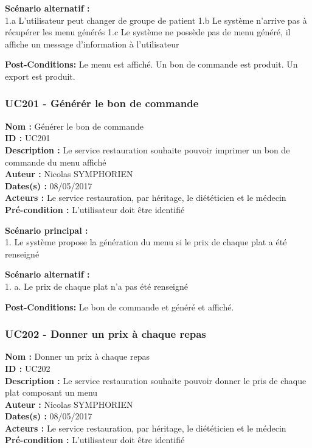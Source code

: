\textbf{Scénario alternatif :}\\
1.a L'utilisateur peut changer de groupe de patient 1.b Le système
n'arrive pas à récupérer les menu générés 1.c Le système ne possède pas
de menu généré, il affiche un message d'information à l'utilisateur

\textbf{Post-Conditions:} Le menu est affiché. Un bon de commande est
produit. Un export est produit.

\subsubsection{UC201 - Générér le bon de
commande}\label{uc201---guxe9nuxe9ruxe9r-le-bon-de-commande}

\noindent\textbf{Nom :} Générer le bon de commande\\
\textbf{ID :} UC201\\
\textbf{Description :} Le service restauration souhaite pouvoir imprimer
un bon de commande du menu affiché\\
\textbf{Auteur :} Nicolas SYMPHORIEN\\
\textbf{Dates(s) :} 08/05/2017\\
\textbf{Acteurs :} Le service restauration, par héritage, le diététicien
et le médecin\\
\textbf{Pré-condition :} L'utilisateur doit être identifié

\textbf{Scénario principal :}\\
1. Le système propose la génération du menu si le prix de chaque plat a
été renseigné

\textbf{Scénario alternatif :}\\
1. a. Le prix de chaque plat n'a pas été renseigné

\textbf{Post-Conditions:} Le bon de commande et généré et affiché.

\subsubsection{UC202 - Donner un prix à chaque
repas}\label{uc202---donner-un-prix-uxe0-chaque-repas}

\noindent\textbf{Nom :} Donner un prix à chaque repas\\
\textbf{ID :} UC202\\
\textbf{Description :} Le service restauration souhaite pouvoir donner
le pris de chaque plat composant un menu\\
\textbf{Auteur :} Nicolas SYMPHORIEN\\
\textbf{Dates(s) :} 08/05/2017\\
\textbf{Acteurs :} Le service restauration, par héritage, le diététicien
et le médecin\\
\textbf{Pré-condition :} L'utilisateur doit être identifié


